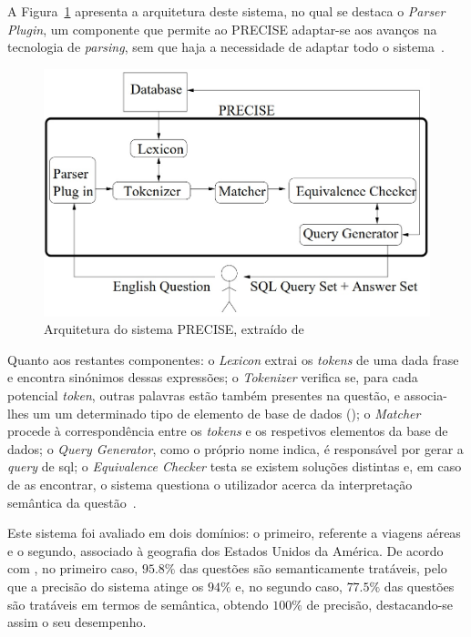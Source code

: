 A Figura~\ref{fig:precise_architecture} apresenta a arquitetura deste sistema, no qual se destaca o \textit{Parser Plugin}, um componente que permite ao PRECISE adaptar-se aos avanços na tecnologia de \textit{parsing}, sem que haja a necessidade de adaptar todo o sistema~\parencite{modern_nlidb_composing_statistical_parsing_semantic_tractability}. 

\begin{figure}[!ht]
    \centering
    \includegraphics[width=.6\textwidth]{ch03/assets/precise_architecture.jpg}
    \caption{Arquitetura do sistema PRECISE, extraído de~\textcite{towards_theory_nli_databases}}
    \label{fig:precise_architecture}
\end{figure}

Quanto aos restantes componentes: o \textit{Lexicon} extrai os \textit{tokens} de uma dada frase e encontra sinónimos dessas expressões; o \textit{Tokenizer} verifica se, para cada potencial \textit{token}, outras palavras estão também presentes na questão, e associa-lhes um um determinado tipo de elemento de base de dados (); o \textit{Matcher} procede à correspondência entre os \textit{tokens} e os respetivos elementos da base de dados; o \textit{Query Generator}, como o próprio nome indica, é responsável por gerar a \textit{query} de \gls{sql}; o \textit{Equivalence Checker} testa se existem soluções distintas e, em caso de as encontrar, o sistema questiona o utilizador acerca da interpretação semântica da questão~\parencite{towards_theory_nli_databases}.

Este sistema foi avaliado em dois domínios: o primeiro, referente a viagens aéreas e o segundo, associado à geografia dos Estados Unidos da América. De acordo com \textcite{nlidb_brief_review}, no primeiro caso, $95.8\%$ das questões são semanticamente tratáveis, pelo que a precisão do sistema atinge os $94\%$ e, no segundo caso, $77.5\%$ das questões são tratáveis em termos de semântica, obtendo $100\%$ de precisão, destacando-se assim o seu desempenho.

